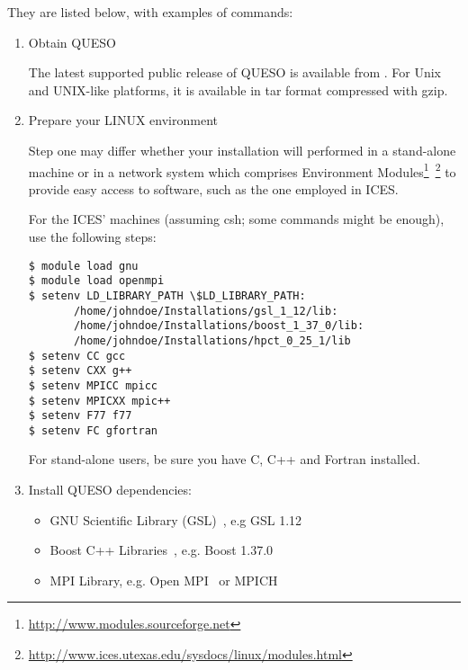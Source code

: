 They are listed below, with examples of commands:
%
\begin{enumerate}

\item Obtain QUESO

The latest supported public release of QUESO is available from \Quesoweb{}.
For Unix and UNIX-like platforms, it is available in tar format compressed with gzip.  %

\item {Prepare your LINUX environment %

Step one may differ whether your installation will performed in a stand-alone machine or in a network system which comprises Environment Modules\footnote{\url{http://www.modules.sourceforge.net}}~\footnote{\url{http://www.ices.utexas.edu/sysdocs/linux/modules.html}} to provide easy access to software, such as the one employed in ICES.

For the ICES' machines (assuming csh; some commands might be enough), use the following steps:
\begin{verbatim}
$ module load gnu
$ module load openmpi
$ setenv LD_LIBRARY_PATH \$LD_LIBRARY_PATH:
       /home/johndoe/Installations/gsl_1_12/lib:
       /home/johndoe/Installations/boost_1_37_0/lib:
       /home/johndoe/Installations/hpct_0_25_1/lib
$ setenv CC gcc
$ setenv CXX g++
$ setenv MPICC mpicc
$ setenv MPICXX mpic++
$ setenv F77 f77
$ setenv FC gfortran
\end{verbatim}
}


For stand-alone users, be sure you have C, C++ and Fortran installed.





\item {Install QUESO dependencies:
\begin{itemize}
\item GNU Scientific Library (GSL)~\cite{Gsl}, e.g GSL 1.12
\item Boost C++ Libraries~\cite{Boost}, e.g. Boost 1.37.0
\item MPI Library, e.g. Open MPI~\cite{Openmpi} or MPICH~\cite{Mpich}



\end{itemize}}
\end{enumerate}
